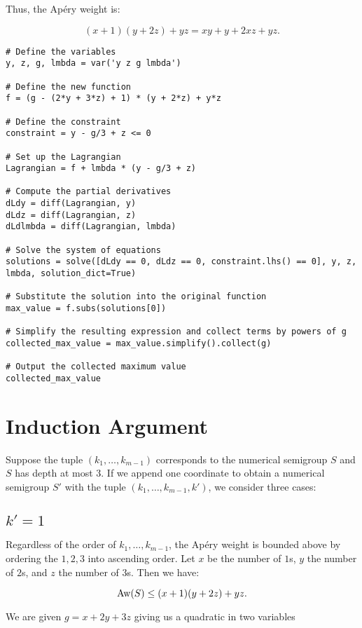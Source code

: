 \documentclass[11pt]{article}
\begin{document}
Thus, the Ap\'ery weight is:

\[
(x+1)(y + 2z) + yz = xy + y + 2xz + yz.
\]

\begin{lstlisting}[style=Sage]
# Define the variables
y, z, g, lmbda = var('y z g lmbda')

# Define the new function
f = (g - (2*y + 3*z) + 1) * (y + 2*z) + y*z

# Define the constraint
constraint = y - g/3 + z <= 0

# Set up the Lagrangian
Lagrangian = f + lmbda * (y - g/3 + z)

# Compute the partial derivatives
dLdy = diff(Lagrangian, y)
dLdz = diff(Lagrangian, z)
dLdlmbda = diff(Lagrangian, lmbda)

# Solve the system of equations
solutions = solve([dLdy == 0, dLdz == 0, constraint.lhs() == 0], y, z, lmbda, solution_dict=True)

# Substitute the solution into the original function
max_value = f.subs(solutions[0])

# Simplify the resulting expression and collect terms by powers of g
collected_max_value = max_value.simplify().collect(g)

# Output the collected maximum value
collected_max_value
\end{lstlisting}

\section{Induction Argument}

Suppose the tuple \((k_1, \dots, k_{m-1})\) corresponds to the numerical semigroup \(S\) and \(S\) has depth at most \(3\). If we append one coordinate to obtain a numerical semigroup \(S'\) with the tuple \((k_1, \dots, k_{m-1}, k')\), we consider three cases:

\subsection{\(k' = 1\)}

Regardless of the order of \(k_1, \dots, k_{m-1}\), the Ap\'ery weight is bounded above by ordering the \(1, 2, 3\) into ascending order. Let \(x\) be the number of \(1\)s, \(y\) the number of \(2\)s, and \(z\) the number of \(3\)s. Then we have:

\[
\text{Aw}(S) \le (x+1)(y+2z) + yz.
\]

We are given \(g = x + 2y + 3z\) giving us a quadratic in two variables
\end{document}
